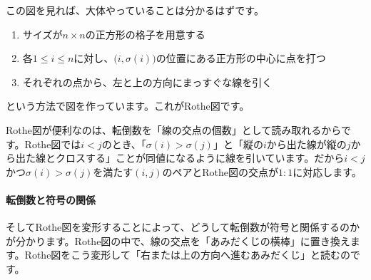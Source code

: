 この図を見れば、大体やっていることは分かるはずです。
\begin{enumerate}
\item サイズが$n\times n$の正方形の格子を用意する
\item 各$1 \leq i \leq n$に対し、$\bigl(i, \sigma(i)\bigr)$の位置にある正方形の中心に点を打つ
\item それぞれの点から、左と上の方向にまっすぐな線を引く
\end{enumerate}
という方法で図を作っています。これがRothe図です。

Rothe図が便利なのは、転倒数を「線の交点の個数」として読み取れるからです。Rothe図では$i < j$のとき、「$\sigma(i) > \sigma(j)$」と「縦の$i$から出た線が縦の$j$から出た線とクロスする」ことが同値になるように線を引いています。だから$i < j$かつ$\sigma(i) > \sigma(j)$を満たす$(i, j)$のペアとRothe図の交点が$1:1$に対応します。

\paragraph{転倒数と符号の関係}

そしてRothe図を変形することによって、どうして転倒数が符号と関係するのかが分かります。Rothe図の中で、線の交点を「あみだくじの横棒」に置き換えます。Rothe図をこう変形して「右または上の方向へ進むあみだくじ」と読むのです。

